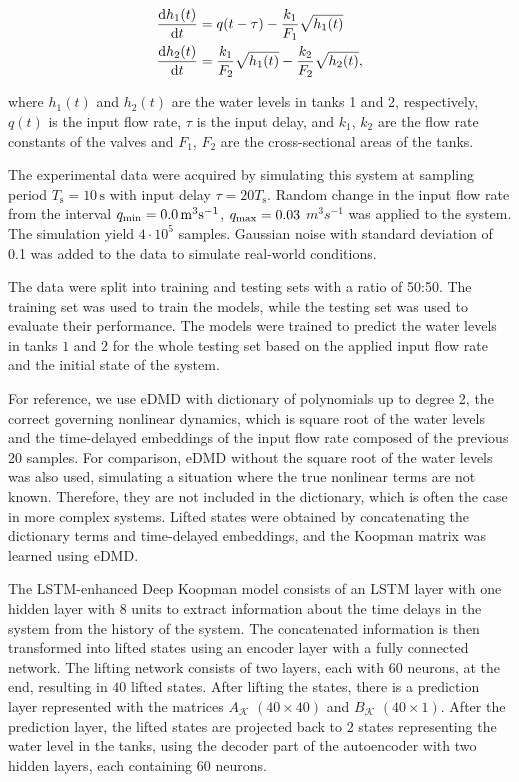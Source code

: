 \documentclass[conference]{IEEEtran}
\newcommand{\ui}[2]{#1_{\text{#2}}}  %
\begin{document}
\begin{equation}
    \begin{aligned}
        \diff{h_1(t)}{t} & = q(t-\tau) - \frac{k_1}{F_1}\sqrt{h_1(t)}                     \\
        \diff{h_2(t)}{t} & = \frac{k_1}{F_2}\sqrt{h_1(t)} - \frac{k_2}{F_2}\sqrt{h_2(t)},
    \end{aligned}
\end{equation}

where \(h_1(t)\) and \(h_2(t)\) are the water levels in tanks 1 and 2, respectively, \(q(t)\) is the input flow rate, \(\tau \) is the input delay, and \(k_1\), \(k_2\) are the flow rate constants of the valves and \(F_1\), \(F_2\) are the cross-sectional areas of the tanks.

The experimental data were acquired by simulating this system at sampling period \( \ui{T}{s} = 10 \, \mathrm{s} \) with input delay \( \tau = 20\ui{T}{s} \). Random change in the input flow rate from the interval \( \ui{q}{\text{min}} = 0.0 \, \unit{m^3s^{-1}} \), \( \ui{q}{\text{max}} = 0.03 \) \( \unit{m^3s^{-1}} \) was applied to the system. The simulation yield \( 4 \cdot 10^5\) samples. Gaussian noise with standard deviation of 0.1 was added to the data to simulate real-world conditions.

The data were split into training and testing sets with a ratio of 50:50. The training set was used to train the models, while the testing set was used to evaluate their performance. The models were trained to predict the water levels in tanks \(1\) and \(2\) for the whole testing set based on the applied input flow rate and the initial state of the system.

For reference, we use eDMD with dictionary of polynomials up to degree 2, the correct governing nonlinear dynamics, which is square root of the water levels and the time-delayed embeddings of the input flow rate composed of the previous 20 samples. For comparison, eDMD without the square root of the water levels was also used, simulating a situation where the true nonlinear terms are not known. Therefore, they are not included in the dictionary, which is often the case in more complex systems. Lifted states were obtained by concatenating the dictionary terms and time-delayed embeddings, and the Koopman matrix was learned using eDMD\@.

The LSTM-enhanced Deep Koopman model consists of an LSTM layer with one hidden layer with \(8\) units to extract information about the time delays in the system from the history of the system. The concatenated information is then transformed into lifted states using an encoder layer with a fully connected network. The lifting network consists of two layers, each with \(60\) neurons, at the end, resulting in \(40\) lifted states. After lifting the states, there is a prediction layer represented with the matrices \(A_\mathcal{K}\) \(\left(40 \times 40\right)\) and \(B_\mathcal{K}\) \(\left(40 \times 1\right)\). After the prediction layer, the lifted states are projected back to \(2\) states representing the water level in the tanks, using the decoder part of the autoencoder with two hidden layers, each containing \(60\) neurons.
\end{document}
